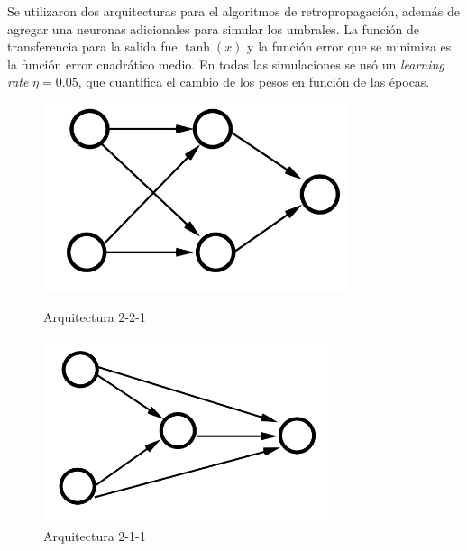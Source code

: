 Se utilizaron dos arquitecturas para el algoritmos de retropropagación, además de agregar una neuronas adicionales para simular los umbrales. La función de transferencia para la salida fue $\tanh({x})$ y la función error que se minimiza es la función error cuadrático medio. En todas las simulaciones se usó un \emph{learning rate} $\eta=0.05$, que cuantifica el cambio de los pesos en función de las épocas.

\begin{figure}[H]
    \begin{minipage}{0.24\textwidth}
        \centering
        \includegraphics[width=0.8\textwidth]{ejer_1_221.png} %
       \caption{Arquitectura 2-2-1}\label{fig:arq-221}
    \end{minipage}\hfill%
    \begin{minipage}{0.24\textwidth}
        \centering
		\includegraphics[width=0.75\textwidth]{ejer_1_211.png} %
        \caption{Arquitectura 2-1-1} \label{fig:arq-211}
    \end{minipage}
\end{figure}



